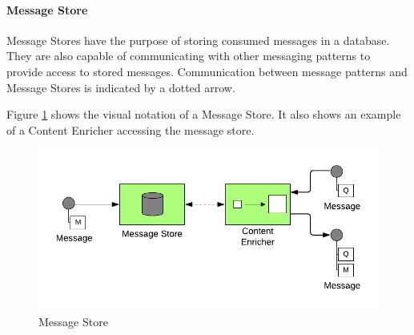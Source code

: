 \paragraph{Message Store}

Message Stores have the purpose of storing consumed messages in a database. They are also capable of communicating with other messaging patterns to provide access to stored messages. Communication between message patterns and Message Stores is indicated by a dotted arrow.

Figure \ref{messaging:store} shows the visual notation of a Message Store. It also shows an example of a Content Enricher accessing the message store.

\begin{figure}[H]
    \centering
    \includegraphics[scale=0.6]{Diagrams/Messaging/12. Message Store.pdf}
    \caption{Message Store}
    \label{messaging:store}
\end{figure}

